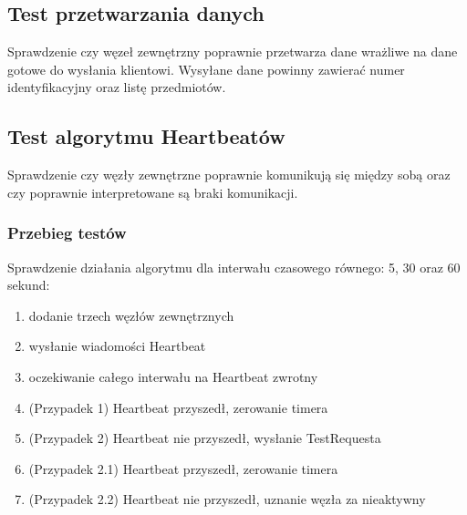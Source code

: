 \subsection[Test przetwarzania danych]{Test przetwarzania danych}
Sprawdzenie czy węzeł zewnętrzny poprawnie przetwarza dane wrażliwe na dane gotowe do wysłania klientowi. Wysyłane dane powinny zawierać numer identyfikacyjny oraz listę przedmiotów.

\subsection[Test algorytmu Heartbeatów]{Test algorytmu Heartbeatów}
Sprawdzenie czy węzły zewnętrzne poprawnie komunikują się między sobą oraz czy poprawnie interpretowane są braki komunikacji.

\subsubsection*[Przebieg testów]{Przebieg testów}
Sprawdzenie działania algorytmu dla interwału czasowego równego: 5, 30 oraz 60 sekund:
\begin{enumerate}
\item dodanie trzech węzłów zewnętrznych
\item wysłanie wiadomości Heartbeat
\item oczekiwanie całego interwału na Heartbeat zwrotny
\item (Przypadek 1) Heartbeat przyszedł, zerowanie timera
\item (Przypadek 2) Heartbeat nie przyszedł, wysłanie TestRequesta
\item (Przypadek 2.1) Heartbeat przyszedł, zerowanie timera
\item (Przypadek 2.2) Heartbeat nie przyszedł, uznanie węzła za nieaktywny
\end{enumerate}


